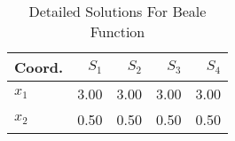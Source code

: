 \begin{table}
\centering
\caption{Detailed Solutions For Beale Function}
\label{detailedsolutions:beale}
\begin{tabular}{lrrrr}
\toprule
 Coord. &  $S_{1}$ &  $S_{2}$ &  $S_{3}$ &  $S_{4}$ \\
\midrule
$x_{1}$ &     3.00 &     3.00 &     3.00 &     3.00 \\
$x_{2}$ &     0.50 &     0.50 &     0.50 &     0.50 \\
\bottomrule
\end{tabular}
\end{table}
